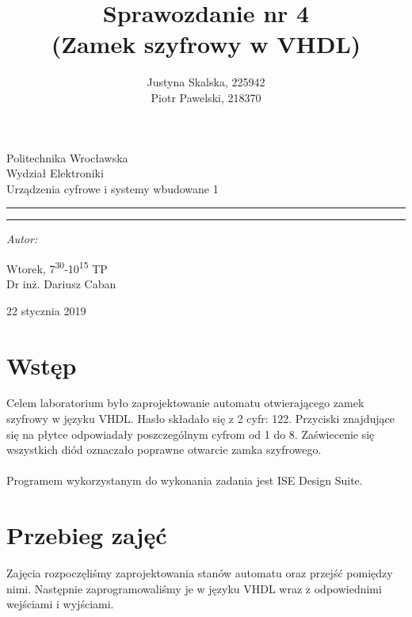 \documentclass[12pt,a4paper,titlepage]{article}
\author{Justyna Skalska, 225942\\
        Piotr Pawelski, 218370}
\title{Sprawozdanie nr 4\\
\large(Zamek szyfrowy w VHDL)}
\makeatletter
\newcommand{\linia}{\rule{\linewidth}{0.4mm}}
\renewcommand{\maketitle}{\begin{titlepage}
    \vspace*{1cm}
    \begin{center}\small
    Politechnika Wrocławska\\
    Wydział Elektroniki\\
    Urządzenia cyfrowe i systemy wbudowane 1
    \end{center}
    \vspace{3cm}
    \noindent\linia
    \begin{center}
      \LARGE \textsc{\@title}
         \end{center}
     \linia
    \vspace{0.5cm}
    \begin{flushright}
    \begin{minipage}{7cm}
    \textit{\small Autor:}\\
    \normalsize \textsc{\@author} \par
    \end{minipage}
    \vspace{5cm}

     {\small Wtorek, 7\textsuperscript{30}-10\textsuperscript{15} TP}\\
        Dr inż. Dariusz Caban
     \end{flushright}
    \vspace*{\stretch{6}}
    \begin{center}
   22 stycznia 2019
    \end{center}
  \end{titlepage}%
}
\makeatother
\begin{document}
\maketitle

\section{Wstęp}
Celem laboratorium było zaprojektowanie automatu otwierającego zamek szyfrowy w języku VHDL. Hasło składało się z 2 cyfr: 122. Przyciski znajdujące się na płytce odpowiadały poszczególnym cyfrom od 1 do 8. Zaświecenie się wszystkich diód oznaczało poprawne otwarcie zamka szyfrowego.\\\\
Programem wykorzystanym do wykonania zadania jest ISE Design Suite.

\section{Przebieg zajęć}
Zajęcia rozpoczęliśmy zaprojektowania stanów automatu oraz przejść pomiędzy nimi. Następnie zaprogramowaliśmy je w języku VHDL wraz z odpowiednimi wejściami i wyjściami. 
\end{document}
